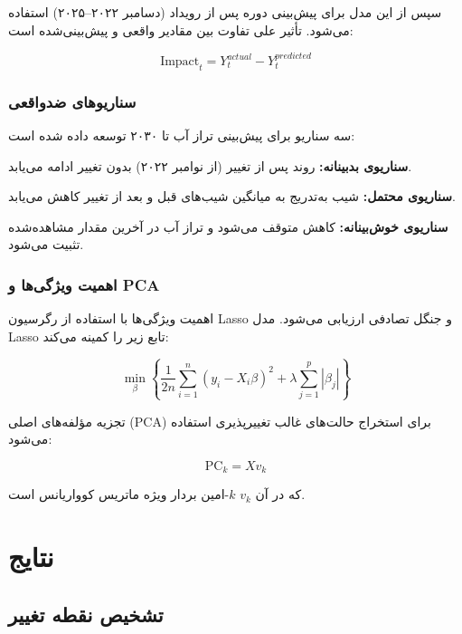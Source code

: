 \documentclass[12pt,a4paper,twocolumn]{article}
\begin{document}
سپس از این مدل برای پیش‌بینی دوره پس از رویداد (دسامبر ۲۰۲۲–۲۰۲۵) استفاده می‌شود. تأثیر علی تفاوت بین مقادیر واقعی و پیش‌بینی‌شده است:

\begin{equation}
\text{Impact}_t = Y_t^{actual} - Y_t^{predicted}
\end{equation}

\subsubsection{سناریوهای ضدواقعی}

سه سناریو برای پیش‌بینی تراز آب تا ۲۰۳۰ توسعه داده شده است:

\textbf{سناریوی بدبینانه:} روند پس از تغییر (از نوامبر ۲۰۲۲) بدون تغییر ادامه می‌یابد.

\textbf{سناریوی محتمل:} شیب به‌تدریج به میانگین شیب‌های قبل و بعد از تغییر کاهش می‌یابد.

\textbf{سناریوی خوش‌بینانه:} کاهش متوقف می‌شود و تراز آب در آخرین مقدار مشاهده‌شده تثبیت می‌شود.

\subsubsection{اهمیت ویژگی‌ها و PCA}

اهمیت ویژگی‌ها با استفاده از رگرسیون Lasso و جنگل تصادفی ارزیابی می‌شود. مدل Lasso تابع زیر را کمینه می‌کند:

\begin{equation}
\min_{\beta} \left\{ \frac{1}{2n} \sum_{i=1}^{n} (y_i - X_i \beta)^2 + \lambda \sum_{j=1}^{p} |\beta_j| \right\}
\end{equation}

تجزیه مؤلفه‌های اصلی (PCA) برای استخراج حالت‌های غالب تغییرپذیری استفاده می‌شود:

\begin{equation}
\text{PC}_k = X v_k
\end{equation}

که در آن $v_k$ $k$-امین بردار ویژه ماتریس کوواریانس است.

\section{نتایج}

\subsection{تشخیص نقطه تغییر}
\end{document}
